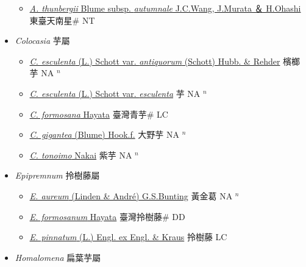 \begin{itemize}
\begin{itemize}
        \item[] \href{http://www.theplantlist.org/tpl1.1/search?q=Arisaema+thunbergii+subsp.+autumnale}{\textit{A. thunbergii} Blume subsp. \textit{autumnale} J.C.Wang, J.Murata ＆ H.Ohashi}   東臺天南星\# NT
  \end{itemize}
 \item[] \textit{Colocasia} 芋屬
                    
  \begin{itemize}
        \item[] \href{http://www.theplantlist.org/tpl1.1/search?q=Colocasia+esculenta+var.+antiquorum}{\textit{C. esculenta} (L.) Schott var. \textit{antiquorum} (Schott) Hubb. \& Rehder}   檳榔芋 NA $^n$
        \item[] \href{http://www.theplantlist.org/tpl1.1/search?q=Colocasia+esculenta+var.+esculenta}{\textit{C. esculenta} (L.) Schott var. \textit{esculenta}}   芋 NA $^n$
        \item[] \href{http://www.theplantlist.org/tpl1.1/search?q=Colocasia+formosana}{\textit{C. formosana} Hayata}   臺灣青芋\# LC
        \item[] \href{http://www.theplantlist.org/tpl1.1/search?q=Colocasia+gigantea}{\textit{C. gigantea} (Blume) Hook.f.}   大野芋 NA $^n$
        \item[] \href{http://www.theplantlist.org/tpl1.1/search?q=Colocasia+tonoimo}{\textit{C. tonoimo} Nakai}   紫芋 NA $^n$
  \end{itemize}
 \item[] \textit{Epipremnum} 拎樹藤屬
                    
  \begin{itemize}
        \item[] \href{http://www.theplantlist.org/tpl1.1/search?q=Epipremnum+aureum}{\textit{E. aureum} (Linden \& André) G.S.Bunting}   黃金葛 NA $^n$
        \item[] \href{http://www.theplantlist.org/tpl1.1/search?q=Epipremnum+formosanum}{\textit{E. formosanum} Hayata}   臺灣拎樹藤\# DD
        \item[] \href{http://www.theplantlist.org/tpl1.1/search?q=Epipremnum+pinnatum}{\textit{E. pinnatum} (L.) Engl. ex Engl. \& Kraus}   拎樹藤 LC
  \end{itemize}
 \item[] \textit{Homalomena} 扁葉芋屬
                    

\end{itemize}
